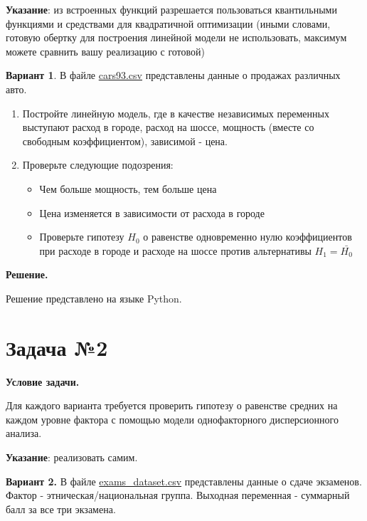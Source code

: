 \documentclass[12pt]{article}
\begin{document}
	\textbf{Указание}: из встроенных функций разрешается пользоваться квантильными функциями и средствами для квадратичной оптимизации (иными словами, готовую обертку для построения линейной модели не использовать, максимум можете сравнить вашу реализацию с готовой)
	
	\textbf{Вариант 1}.
	В файле \href{https://drive.google.com/file/d/1vv2jGNp6EO8HHRoscDRQU90faR3j8iTN/view}{cars93.csv} представлены данные о продажах различных авто.
	
	\begin{enumerate}
		\item Постройте линейную модель, где в качестве независимых переменных выступают расход в городе, расход на шоссе, мощность (вместе со свободным коэффициентом), зависимой - цена.
		
		\item Проверьте следующие подозрения:
		\begin{itemize}
			\item Чем больше мощность, тем больше цена
			
			\item Цена изменяется в зависимости от расхода в городе
			
			\item Проверьте гипотезу $H_0$ о равенстве одновременно нулю коэффициентов при расходе в городе и расходе на шоссе против альтернативы $H_1 = \bar{H_0}$
		\end{itemize}
	\end{enumerate}
	
	\textbf{Решение.}
	
	Решение представлено на языке Python.
	\vspace*{1em}
	
	\section*{Задача №2}
	
	\textbf{Условие задачи.}
	
	Для каждого варианта требуется проверить гипотезу о равенстве средних на каждом уровне фактора с помощью модели однофакторного дисперсионного анализа.
	
	\textbf{Указание}: реализовать самим.
	
	\textbf{Вариант 2.}
	В файле \href{https://drive.google.com/file/d/14L_y0LOAebuuqh8PllOw64cJQwVkmlV6/view}{exams\_dataset.csv} представлены данные о сдаче экзаменов. Фактор - этническая/национальная группа. Выходная переменная - суммарный балл за все три экзамена.
	\vspace*{1em}
	
\end{document}
